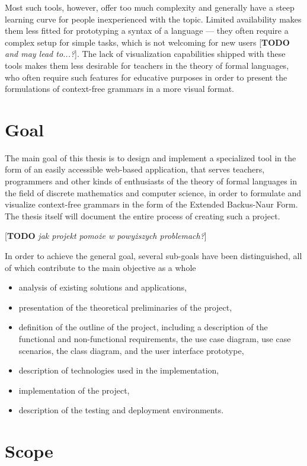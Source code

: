 \documentclass[english,engineering]{wizthesis}
\newcommand{\todo}[1]{{\color{red}[\textbf{TODO} \textit{#1}]}}
\begin{document}
Most such tools, however, offer too much complexity and generally have a steep
learning curve for people inexperienced with the topic. Limited availability
makes them less fitted for prototyping a syntax of a language --- they often
require a complex setup for simple tasks, which is not welcoming for new users
\todo{and may lead to...?}. The lack of visualization capabilities shipped with
these tools makes them less desirable for teachers in the theory of formal
languages, who often require such features for educative purposes in order to
present the formulations of context-free grammars in a more visual format.

\section{Goal}

The main goal of this thesis is to design and implement a specialized tool in
the form of an easily accessible web-based application, that serves teachers,
programmers and other kinds of enthusiasts of the theory of formal languages in
the field of discrete mathematics and computer science, in order to formulate
and visualize context-free grammars in the form of the Extended Backus-Naur
Form. The thesis itself will document the entire process of creating such a
project.

\todo{jak projekt pomoże w powyższych problemach?}

In order to achieve the general goal, several sub-goals have been
distinguished, all of which contribute to the main objective as a whole
\begin{itemize}
  \item analysis of existing solutions and applications,
  \item presentation of the theoretical preliminaries of the project,
  \item definition of the outline of the project, including a description of
  the functional and non-functional requirements, the use case diagram, use case
  scenarios, the class diagram, and the user interface prototype,
  \item description of technologies used in the implementation,
  \item implementation of the project,
  \item description of the testing and deployment environments.
\end{itemize}

\section{Scope}
\end{document}
